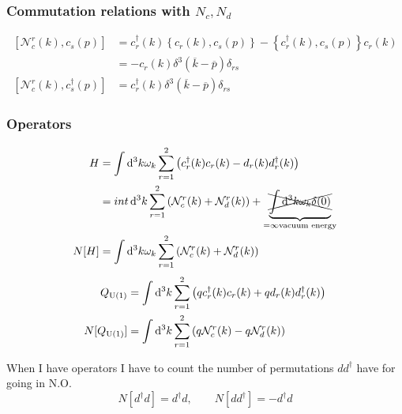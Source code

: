 \subsubsection{Commutation relations with $N_c, N_d$}
\begin{align*}
\left[\mathcal{N}_c^r(k), c_s(p)\right] &= c_r^\dagger(k)\left\{c_r(k), c_s(p)\right\} - \left\{c_r^\dagger(k),c_s(p)\right\}c_r(k) \\
&= - c_r(k)\delta^3(\overline{k}- \overline{p})\delta_{rs}\\
\left[\mathcal{N}_c^r(k), c_s^\dagger(p)\right] &= c_r^\dagger(k)\delta^3(\overline{k}- \overline{p})\delta_{rs}
\end{align*}

\subsubsection{Operators}
\begin{align*}
H &= \int \operatorname{d \!}{^3k}\omega_k\sum^2_{r=1}\left(c_r^\dagger(k)c_r(k) - d_r(k)d^\dagger_r(k)\right) \\
&=int \operatorname{d \!}{^3k}\sum^2_{r=1}\left(\mathcal{N}_c^r(k) + \mathcal{N}_d^r(k)\right) + \underbrace{\xcancel{\int \operatorname{d \!}{^3k}\omega_k\delta(0)}}_{=\infty \text{vacuum energy}} \\
N[H] &= \int \operatorname{d \!}{^3k}\omega_k\sum^2_{r=1}\left(\mathcal{N}_c^r(k)+\mathcal{N}_d^r(k)\right)
\end{align*}
\begin{align*}
Q_{\operatorname{U}(1)} &= \int \operatorname{d \!}{^3k}\sum^2_{r=1}\left(qc_r^\dagger(k)c_r(k)+qd_r(k)d^\dagger_r(k)\right) \\
N[Q_{\operatorname{U}(1)}] &= \int \operatorname{d \!}{^3k}\sum^2_{r=1}\left(q\mathcal{N}_c^r(k)-q\mathcal{N}_d^r(k)\right)
\end{align*}

\begin{definition}
When I have  operators I have to count the number of permutations $dd^\dagger$ have for going in N.O.
\[ N[d^\dagger d] = d^\dagger d,  \qquad N[dd^\dagger] = -d^\dagger d \]
\end{definition}

